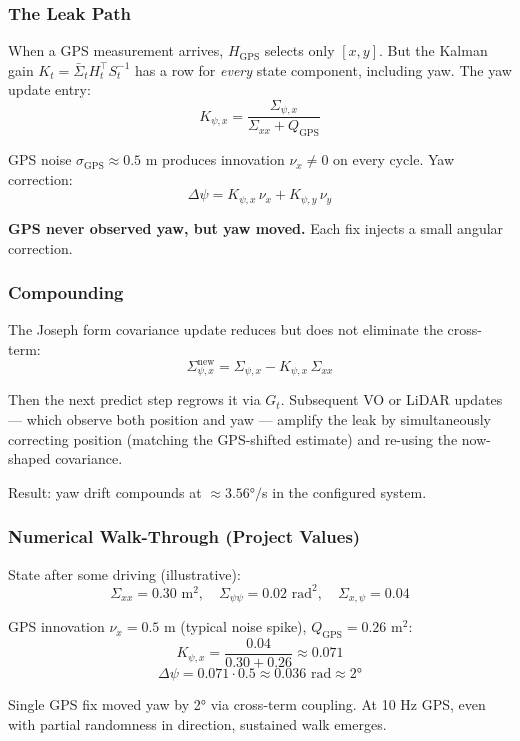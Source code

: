 \documentclass[11pt,a4paper]{article}
\begin{document}
\subsubsection{The Leak Path}

When a GPS measurement arrives, $H_{\text{GPS}}$ selects only $[x, y]$. But the Kalman gain $K_t = \bar{\Sigma}_t H_t^\top S_t^{-1}$ has a row for \emph{every} state component, including yaw. The yaw update entry:
\[
K_{\psi, x} = \frac{\Sigma_{\psi,x}}{\Sigma_{xx} + Q_{\text{GPS}}}
\]

GPS noise $\sigma_{\text{GPS}} \approx 0.5$ m produces innovation $\nu_x \neq 0$ on every cycle. Yaw correction:
\[
\Delta\psi = K_{\psi,x}\,\nu_x + K_{\psi,y}\,\nu_y
\]

\textbf{GPS never observed yaw, but yaw moved.} Each fix injects a small angular correction.

\subsubsection{Compounding}

The Joseph form covariance update reduces but does not eliminate the cross-term:
\[
\Sigma_{\psi,x}^{\text{new}} = \Sigma_{\psi,x} - K_{\psi,x}\,\Sigma_{xx}
\]

Then the next predict step regrows it via $G_t$. Subsequent VO or LiDAR updates --- which observe both position and yaw --- amplify the leak by simultaneously correcting position (matching the GPS-shifted estimate) and re-using the now-shaped covariance.

Result: yaw drift compounds at $\approx 3.56°/$s in the configured system.

\subsubsection{Numerical Walk-Through (Project Values)}

State after some driving (illustrative):
\[
\Sigma_{xx} = 0.30 \text{ m}^2, \quad \Sigma_{\psi\psi} = 0.02 \text{ rad}^2, \quad \Sigma_{x,\psi} = 0.04
\]

GPS innovation $\nu_x = 0.5$ m (typical noise spike), $Q_{\text{GPS}} = 0.26$ m$^2$:
\[
K_{\psi,x} = \frac{0.04}{0.30 + 0.26} \approx 0.071
\]
\[
\Delta\psi = 0.071 \cdot 0.5 \approx 0.036 \text{ rad} \approx 2°
\]

Single GPS fix moved yaw by 2° via cross-term coupling. At 10 Hz GPS, even with partial randomness in direction, sustained walk emerges.
\end{document}
